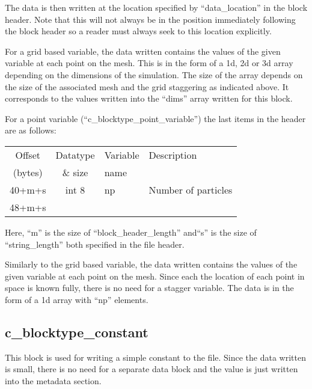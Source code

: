 \documentclass[12pt]{article}
\begin{document}
The data is then written at the location specified by ``data\_location'' in
the block header. Note that this will not always be in the position immediately
following the block header so a reader must always seek to this location
explicitly.

For a grid based variable, the data written contains the values of the given
variable at each point on the mesh. This is in the form of a 1d, 2d or 3d
array depending on the dimensions of the simulation. The size of the array
depends on the size of the associated mesh and the grid staggering as
indicated above. It corresponds to the values written into the ``dims''
array written for this block.

For a point variable (``c\_blocktype\_point\_variable'') the last items in the
header are as follows:\\

\begin{center}
\begin{tabularx}{0.9\textwidth}[!hbt]{cclX}
  Offset & Datatype & Variable & Description\\
  (bytes) & \& size & name &
  \\\toprule

  40+m+s & int 8 & np & Number of particles
  \\\midrule

  48+m+s &
\end{tabularx}
\end{center}\vspace{10pt}

Here, ``m'' is the size of ``block\_header\_length'' and``s'' is the size of
``string\_length'' both specified in the file header.

Similarly to the grid based variable, the data written contains the values of
the given variable at each point on the mesh. Since each the location of
each point in space is known fully, there is no need for a stagger variable.
The data is in the form of a 1d array with ``np'' elements.

\subsection{c\_blocktype\_constant}

This block is used for writing a simple constant to the file. Since the
data written is small, there is no need for a separate data block and
the value is just written into the metadata section.\\
\end{document}
